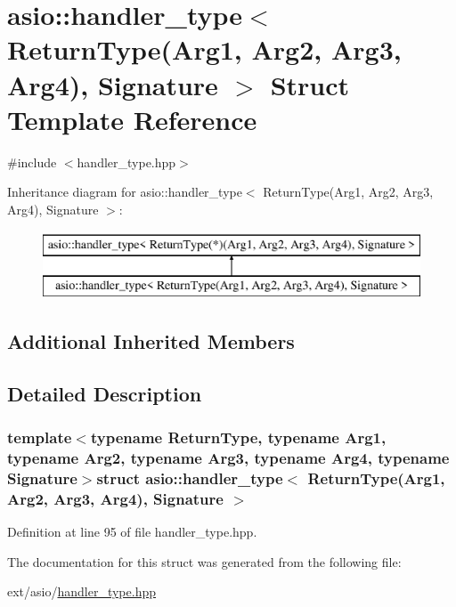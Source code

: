 \hypertarget{structasio_1_1handler__type_3_01_return_type_07_arg1_00_01_arg2_00_01_arg3_00_01_arg4_08_00_01_signature_01_4}{}\section{asio\+:\+:handler\+\_\+type$<$ Return\+Type(Arg1, Arg2, Arg3, Arg4), Signature $>$ Struct Template Reference}
\label{structasio_1_1handler__type_3_01_return_type_07_arg1_00_01_arg2_00_01_arg3_00_01_arg4_08_00_01_signature_01_4}


{\ttfamily \#include $<$handler\+\_\+type.\+hpp$>$}

Inheritance diagram for asio\+:\+:handler\+\_\+type$<$ Return\+Type(Arg1, Arg2, Arg3, Arg4), Signature $>$\+:\begin{figure}[H]
\begin{center}
\leavevmode
\includegraphics[height=2.000000cm]{structasio_1_1handler__type_3_01_return_type_07_arg1_00_01_arg2_00_01_arg3_00_01_arg4_08_00_01_signature_01_4}
\end{center}
\end{figure}
\subsection*{Additional Inherited Members}


\subsection{Detailed Description}
\subsubsection*{template$<$typename Return\+Type, typename Arg1, typename Arg2, typename Arg3, typename Arg4, typename Signature$>$struct asio\+::handler\+\_\+type$<$ Return\+Type(\+Arg1, Arg2, Arg3, Arg4), Signature $>$}



Definition at line 95 of file handler\+\_\+type.\+hpp.



The documentation for this struct was generated from the following file\+:\begin{DoxyCompactItemize}
\item 
ext/asio/\hyperlink{handler__type_8hpp}{handler\+\_\+type.\+hpp}\end{DoxyCompactItemize}
